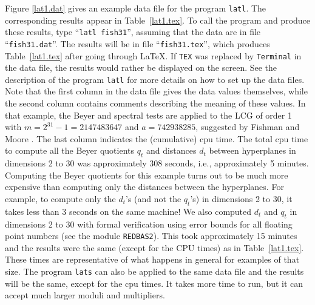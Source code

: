 Figure \ref{lat1.dat} gives an example data file for the program {\tt latl}.
The corresponding results appear in Table~\ref{lat1.tex}.
To call the program and produce these results, type ``{\tt latl fish31}'',
assuming that the data are in file ``{\tt fish31.dat}''.
The results will be in file ``{\tt fish31.tex}'', which produces
Table~\ref{lat1.tex} after going through \LaTeX.
If {\tt TEX} was replaced by {\tt Terminal} in the data file,
the results would rather be displayed on the screen.
See the description of the program {\tt latl} for more details on how
to set up the data files.
Note that the first column in the data file gives the data values themselves,
while the second column contains comments describing the meaning of these
values.
In that example, the Beyer and spectral tests are applied to
the LCG of order 1 with $m = 2^{31}-1 = 2147483647$ and $a = 742938285$,
suggested by Fishman and Moore \cite {rFIS86a}.
The last column indicates the (cumulative) cpu time.
The total cpu time to compute all the Beyer quotients $q_t$ and
distances $d_t$ between hyperplanes in dimensions 2 to 30 was approximately
308 seconds, i.e., approximately 5 minutes.
Computing the Beyer quotients for this example turns out to be
much more expensive than computing only the distances between the hyperplanes.
For example, to compute only the $d_t$'s (and not the $q_t$'s)
in dimensions 2 to 30, it takes less than 3 seconds on the same machine!
We also computed $d_t$ and $q_t$ in dimensions 2 to 30 with formal
verification using error bounds for all floating point numbers
(see the module {\tt REDBAS2}).  This took approximately 15 minutes
and the results were the same (except for the CPU times)
as in Table~\ref{lat1.tex}.
These times are representative of what happens in general for examples 
of that size.
The program {\tt lats} can also be applied to the same data file and the
results will be the same, except for the cpu times.
It takes more time to run, but it can accept much larger moduli
and multipliers.


